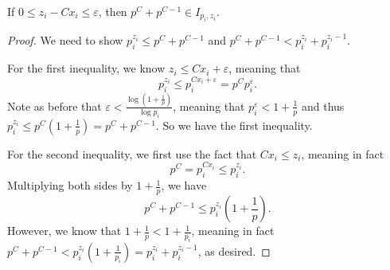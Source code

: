 \documentclass[10pt,a4paper]{amsart}
\begin{document}
\begin{lemma} \label{lem:intervaltwo}
  If $0 \leq z_i - Cx_i \leq \varepsilon$, then $p^C + p^{C-1} \in I_{p_i, z_i}$.
\end{lemma}

\begin{proof}
  We need to show $p_i^{z_i} \leq p^C + p^{C-1}$ and $p^C + p^{C-1} < p_i^{z_i} + p_i^{z_i-1}$.

  For the first inequality, we know $z_i \leq Cx_i + \varepsilon$, meaning that
  \[
    p_i^{z_i} \leq p_i^{Cx_i + \varepsilon} = p^C p_i^{\varepsilon}.
  \]
  Note as before that $\varepsilon < \frac{\log 
  \left(1 + \frac1p\right)}{\log {p_i}}$, meaning that $p_i^\varepsilon < 1 + \frac1p$ and thus $p_i^{z_i} \leq p^C\left(1 + \frac1p\right) = p^C + p^{C-1}$. So we have the first inequality.

  For the second inequality, we first use the fact that $Cx_i \leq z_i$, meaning in fact
  \[
    p^C = p_i^{Cx_i} \leq p_i^{z_i}.
  \]
  Multiplying both sides by $1 + \frac1p$, we have
  \[
    p^C + p^{C-1} \leq p_i^{z_i} \left(1 + \frac1p \right).
  \]
  However, we know that $1 + \frac1p < 1 + \frac{1}{p_i}$, meaning in fact $p^C + p^{C - 1} < p_i^{z_i}\left(1 + \frac1{p_i}\right) = p_i^{z_i} + p_i^{z_i-1}$, as desired.
\end{proof}
\end{document}
